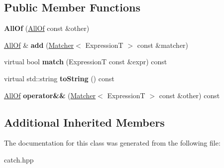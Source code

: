 \subsection*{Public Member Functions}
\begin{DoxyCompactItemize}
\item 
\mbox{\label{classCatch_1_1Matchers_1_1Impl_1_1Generic_1_1AllOf_a31f7c5e570e79bdf64064ee87c331a59}} 
{\bfseries All\+Of} (\hyperlink{classCatch_1_1Matchers_1_1Impl_1_1Generic_1_1AllOf}{All\+Of} const \&other)
\item 
\mbox{\label{classCatch_1_1Matchers_1_1Impl_1_1Generic_1_1AllOf_a8c5cd1e494ab697076da418ee72ac297}} 
\hyperlink{classCatch_1_1Matchers_1_1Impl_1_1Generic_1_1AllOf}{All\+Of} \& {\bfseries add} (\hyperlink{structCatch_1_1Matchers_1_1Impl_1_1Matcher}{Matcher}$<$ ExpressionT $>$ const \&matcher)
\item 
\mbox{\label{classCatch_1_1Matchers_1_1Impl_1_1Generic_1_1AllOf_a95231b6a455e1a646d0b54bce55138be}} 
virtual bool {\bfseries match} (ExpressionT const \&expr) const
\item 
\mbox{\label{classCatch_1_1Matchers_1_1Impl_1_1Generic_1_1AllOf_a8c8e7742501dc81e51a3c745d6f74119}} 
virtual std\+::string {\bfseries to\+String} () const
\item 
\mbox{\label{classCatch_1_1Matchers_1_1Impl_1_1Generic_1_1AllOf_aca6497aaa7fdb6560ebe850f32ccbf15}} 
\hyperlink{classCatch_1_1Matchers_1_1Impl_1_1Generic_1_1AllOf}{All\+Of} {\bfseries operator\&\&} (\hyperlink{structCatch_1_1Matchers_1_1Impl_1_1Matcher}{Matcher}$<$ ExpressionT $>$ const \&other) const
\end{DoxyCompactItemize}
\subsection*{Additional Inherited Members}


The documentation for this class was generated from the following file\+:\begin{DoxyCompactItemize}
\item 
catch.\+hpp\end{DoxyCompactItemize}
